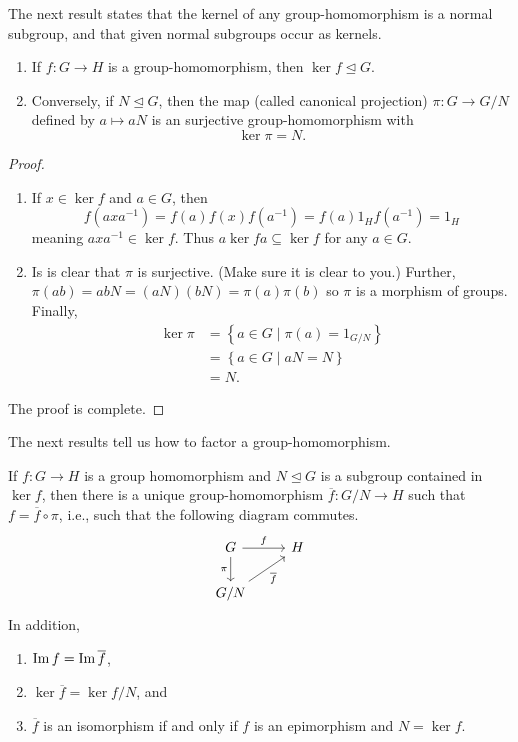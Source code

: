 \documentclass[11pt,a4paper]{article}
\begin{document}
The next result states that the kernel of any group-homomorphism is a normal subgroup, and that given normal subgroups occur as kernels.

\begin{teo}\hfill
\begin{enumerate}[label=(\roman*)]
    \item If \( f: G \to H \) is a group-homomorphism, then \( \ker f \trianglelefteq G \).
    \item Conversely, if \( N \trianglelefteq G \), then the map (called canonical projection) \( \pi: G \to G/N \) defined by \( a \mapsto aN \) is an surjective group-homomorphism with \[ \ker \pi = N .\]
\end{enumerate}
    

\end{teo}


\begin{proof}
\begin{enumerate}[label=(\roman*)]
    \item If \(x\in \ker f\) and \(a\in G\), then 
    \[f(axa^{-1}) = f(a)f(x)f(a^{-1}) = f(a)1_H f(a^{-1}) = 1_H\]
    meaning \(axa^{-1} \in \ker f\).
    Thus \(a \ker f a \subseteq \ker f\) for any \(a\in G\).

    \item Is is clear that \(\pi\) is surjective. (Make sure it is clear to you.) Further, \(\pi (ab) = ab N = (aN)(bN) = \pi (a) \pi (b)\) so \(\pi\) is a morphism of groups.
    Finally, 
    \begin{align*}
        \ker \pi &= \left\{ a\in G \mid \pi (a) = 1_{G/N} \right\}\\
        &= \left\{ a\in G \mid aN  = N \right\}\\
        &= N.
    \end{align*}
\end{enumerate}
The proof is complete.
\end{proof}

The next results tell us how to factor a group-homomorphism.

\begin{teo}\label{thm:dad.of.isomorphism.thms}
    If \( f: G \to H \) is a group homomorphism and \( N \trianglelefteq G \) is a subgroup contained in \( \ker f \), then there is a unique group-homomorphism \(\overline{f}\colon G/N \to H\) such that \(f = \overline{f}\circ \pi\), i.e., such that   the following diagram commutes.
    \[\begin{tikzcd}
        G \arrow[r, "f"] \arrow[d, "\pi"'] & H \\
        G/N \arrow[ru, "\overline{f}"']    &  
        \end{tikzcd}\]
    In addition, 
    \begin{enumerate}[label=(\roman*)]
        \item \(\operatorname{Im} f = \operatorname{Im} \overline{f}\),
        \item \(\ker \overline{f} = \ker f / N\), and 
        \item \(\overline{f} \) is an isomorphism if and only if \(f\) is an epimorphism and \(N = \ker f\).
    \end{enumerate}
\end{teo}
\end{document}
